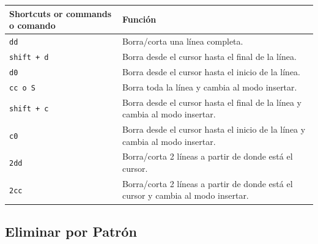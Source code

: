 \documentclass[
  doc,
  floatsintext,
  longtable,
  a4paper,
  nolmodern,
  notxfonts,
  notimes,
  12pt,
  colorlinks=true,linkcolor=blue,citecolor=blue,urlcolor=blue]{apa7}
\newcounter{none} %
\begin{document}
{\def\LTcaptype{none} %
\begin{longtable}[]{@{}
  >{\raggedright\arraybackslash}p{}
  >{\raggedright\arraybackslash}p{}@{}}
\toprule\noalign{}
\begin{minipage}[b]{\linewidth}\raggedright
Shortcuts or commands o comando
\end{minipage} & \begin{minipage}[b]{\linewidth}\raggedright
Función
\end{minipage} \\
\midrule\noalign{}
\endhead
\bottomrule\noalign{}
\endlastfoot
\texttt{dd} & Borra/corta una línea completa. \\
\texttt{shift\ +\ d} & Borra desde el cursor hasta el final de la
línea. \\
\texttt{d0} & Borra desde el cursor hasta el inicio de la línea. \\
\texttt{cc\ o\ S} & Borra toda la línea y cambia al modo insertar. \\
\texttt{shift\ +\ c} & Borra desde el cursor hasta el final de la línea
y cambia al modo insertar. \\
\texttt{c0} & Borra desde el cursor hasta el inicio de la línea y cambia
al modo insertar. \\
\texttt{2dd} & Borra/corta 2 líneas a partir de donde está el cursor. \\
\texttt{2cc} & Borra/corta 2 líneas a partir de donde está el cursor y
cambia al modo insertar. \\
\end{longtable}
}

\subsection{Eliminar por Patrón}\label{eliminar-por-patruxf3n}
\end{document}
